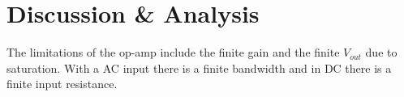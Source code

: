 \documentclass[11pt,onecolumn]{article}
\begin{document}
\section{Discussion \& Analysis}\label{sec:Discussion_and_Analysis}
The limitations of the op-amp include the finite gain and the finite $V_{out}$ due to saturation. With a AC input there is a finite bandwidth and in DC there is a finite input resistance.


\end{document}
